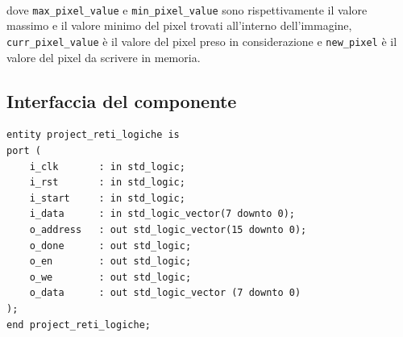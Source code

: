 \documentclass[11pt, a4paper]{article}
\DeclarePairedDelimiter\floor{\lfloor}{\rfloor}
\begin{document}
\noindent{}
\\
\\
\\
dove \texttt{max\_pixel\_value} e \texttt{min\_pixel\_value} sono rispettivamente il valore massimo e il valore minimo del pixel trovati all'interno dell'immagine, \texttt{curr\_pixel\_value} è il valore del pixel preso in considerazione e \texttt{new\_pixel} è il valore del pixel da scrivere in memoria.
\pagebreak

\subsection{Interfaccia del componente}
\begin{lstlisting}
entity project_reti_logiche is
port (
    i_clk       : in std_logic;
    i_rst       : in std_logic;
    i_start     : in std_logic;
    i_data      : in std_logic_vector(7 downto 0);
    o_address   : out std_logic_vector(15 downto 0);
    o_done      : out std_logic;
    o_en        : out std_logic;
    o_we        : out std_logic;
    o_data      : out std_logic_vector (7 downto 0)
);
end project_reti_logiche;
\end{lstlisting}
\end{document}
